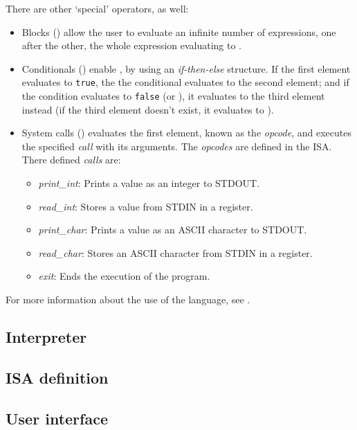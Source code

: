 \noindent
There are other `special' operators, as well:
\begin{itemize}
 \item Blocks () allow the user to evaluate an infinite number of expressions, one after the other, the whole expression evaluating to .
 \item Conditionals () enable , by using an \textit{if-then-else} structure. If the first element evaluates to \texttt{true}, the the conditional evaluates to the second element; and if the condition evaluates to \texttt{false} (or ), it evaluates to the third element instead (if the third element doesn't exist, it evaluates to ).
 \item System calls () evaluates the first element, known as the \textit{opcode}, and executes the specified \textit{call} with its arguments. The \textit{opcodes} are defined in the \gls{ISA}. There defined \textit{calls} are:
 \begin{itemize}[nosep]
    \item \textit{print\_int}: Prints a value as an integer to \gls{STDOUT}.
    \item \textit{read\_int}: Stores a value from \gls{STDIN} in a register.
    \item \textit{print\_char}: Prints a value as an ASCII character to \gls{STDOUT}.
    \item \textit{read\_char}: Stores an ASCII character from \gls{STDIN} in a register.
    \item \textit{exit}: Ends the execution of the program.
  \end{itemize}
\end{itemize}

\noindent
For more information about the use of the language, see .


\subsection{Interpreter}



\subsection{ISA definition}



\subsection{User interface}


